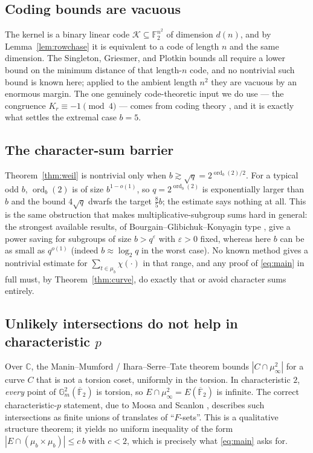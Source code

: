 \documentclass[a4paper]{article}
\theoremstyle{definition}
\newcommand{\F}{\mathbb{F}}
\newcommand{\abs}[1]{\left| #1 \right|}
\begin{document}
	\subsection{Coding bounds are vacuous}
	The kernel is a binary linear code $\mathcal{K} \subseteq \F_2^{n^2}$ of dimension $d(n)$, and by Lemma~\ref{lem:rowchase} it is equivalent to a code of length $n$ and the same dimension.
	The Singleton, Griesmer, and Plotkin bounds all require a lower bound on the minimum distance of that length-$n$ code, and no nontrivial such bound is known here; applied to the ambient length $n^2$ they are vacuous by an enormous margin.
	The one genuinely code-theoretic input we do use --- the congruence $K_r \equiv -1 \pmod 4$ --- comes from coding theory \cite{LachaudWolfmann1990}, and it is exactly what settles the extremal case $b = 5$.

	\subsection{The character-sum barrier}
	Theorem~\ref{thm:weil} is nontrivial only when $b \gtrsim \sqrt q = 2^{\operatorname{ord}_b(2)/2}$.
	For a typical odd $b$, $\operatorname{ord}_b(2)$ is of size $b^{1 - o(1)}$, so $q = 2^{\operatorname{ord}_b(2)}$ is exponentially larger than $b$ and the bound $4\sqrt q$ dwarfs the target $\frac{8}{5}b$; the estimate says nothing at all.
	This is the same obstruction that makes multiplicative-subgroup sums hard in general: the strongest available results, of Bourgain--Glibichuk--Konyagin type \cite{BGK2006}, give a power saving for subgroups of size $b > q^{\varepsilon}$ with $\varepsilon > 0$ fixed, whereas here $b$ can be as small as $q^{o(1)}$ (indeed $b \approx \log_2 q$ in the worst case).
	No known method gives a nontrivial estimate for $\sum_{t \in \mu_b} \chi(\cdot)$ in that range, and any proof of \eqref{eq:main} in full must, by Theorem~\ref{thm:curve}, do exactly that or avoid character sums entirely.

	\subsection{Unlikely intersections do not help in characteristic $p$}
	Over $\mathbb{C}$, the Manin--Mumford / Ihara--Serre--Tate theorem bounds $\abs{C \cap \mu_\infty^2}$ for a curve $C$ that is not a torsion coset, uniformly in the torsion.
	In characteristic $2$, \emph{every} point of $\mathbb{G}_m^2(\overline{\F}_2)$ is torsion, so $E \cap \mu_\infty^2 = E(\overline{\F}_2)$ is infinite.
	The correct characteristic-$p$ statement, due to Moosa and Scanlon \cite{MoosaScanlon2004}, describes such intersections as finite unions of translates of ``$F$-sets''.
	This is a qualitative structure theorem; it yields no uniform inequality of the form $\abs{E \cap (\mu_b\times\mu_b)} \le c\,b$ with $c < 2$, which is precisely what \eqref{eq:main} asks for.
\end{document}
